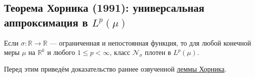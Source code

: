 \documentclass[../NDCNNAI_main.tex]{subfiles}
\begin{document}


\subsection{Теорема Хорника (1991): универсальная аппроксимация в $L^p(\mu)$}

\begin{theorem}[Hornik, 1991]
Если $\sigma\colon \mathbb{R} \to \mathbb{R}$ --- ограниченная и непостоянная функция, то для любой конечной меры $\mu$ на $\mathbb{R}^k$ и любого $1 \leq p < \infty$, класс $\mathcal{N}_\sigma$ плотен в $L^p(\mu)$.
\end{theorem}

Перед этим приведём доказательство раннее озвученной \hyperref[lem:hornik]{леммы Хорника}.
\end{document}
